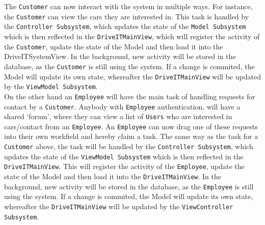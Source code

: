 The \texttt{Customer} can now interact with the system in multiple ways. For instance, the \texttt{Customer} can view the cars they are interested in. This task is handled by the \texttt{Controller Subsystem}, which updates the state of the \texttt{Model Subsystem} which is then reflected in the \texttt{DriveITMainView}, which will register the activity of the \texttt{Customer}, update the state of the Model and then load it into the DriveITSystemView. In the background, new activity will be stored in the database, as the \texttt{Customer} is still using the system. If a change is commited, the Model will update its own state, whereafter the \texttt{DriveITMainView} will be updated by the \texttt{ViewModel Subsystem}.\\

On the other hand an \texttt{Employee} will have the main task of handling requests for contact by a \texttt{Customer}. Anybody with \texttt{Employee} authentication, will have a shared `forum', where they can view a list of \texttt{Users} who are interested in cars/contact from an \texttt{Employee}. An \texttt{Employee} can now drag one of these requests into their own workfield and hereby claim a task. The same way as the task for a \texttt{Customer} above, the task will be  handled by the \texttt{Controller Subsystem}, which updates the state of the \texttt{ViewModel Subsystem} which is then reflected in the \texttt{DriveITMainView}. This will register the activity of the \texttt{Employee}, update the state of the Model and then load it into the \texttt{DriveITMainView}. In the background, new activity will be stored in the database, as the \texttt{Employee} is still using the system. If a change is commited, the Model will update its own state, whereafter the \texttt{DriveITMainView} will be updated by the  \texttt{ViewController Subsystem}.\\


